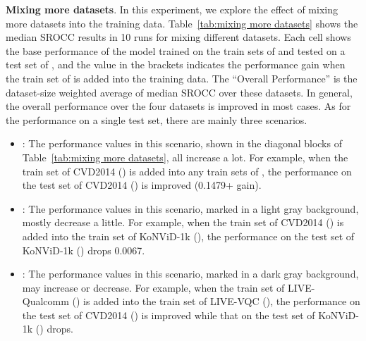 \documentclass[twocolumn]{svjour3}          \smartqed  \usepackage{graphicx}
\begin{document}
\textbf{Mixing more datasets}.
In this experiment, we explore the effect of mixing more datasets into the training data.
Table~\ref{tab:mixing more datasets} shows the median SROCC results in 10 runs for mixing different datasets.
Each cell shows the base performance of the model trained on the train sets of  and tested on a test set of , and the value in the brackets indicates the performance gain when the train set of  is added into the training data.
The ``Overall Performance'' is the dataset-size weighted average of median SROCC over these datasets.
In general, the overall performance over the four datasets is improved in most cases. 
As for the performance on a single test set, there are mainly three scenarios.
\begin{itemize}
\item :
The performance values in this scenario, shown in the diagonal blocks of Table~\ref{tab:mixing more datasets}, all increase a lot. 
For example, when the train set of CVD2014 () is added into any train sets of , the performance on the test set of CVD2014 () is improved (0.1479+ gain). 
\item : 
The performance values in this scenario, marked in a light gray background, mostly decrease a little. 
For example, when the train set of CVD2014 () is added into the train set of KoNViD-1k (), the performance on the test set of KoNViD-1k () drops 0.0067.
\item :
The performance values in this scenario, marked in a dark gray background, may increase or decrease.
For example, when the train set of LIVE-Qualcomm () is added into the train set of LIVE-VQC (), the performance on the test set of CVD2014 () is improved while that on the test set of KoNViD-1k () drops.
\end{itemize}
\end{document}
